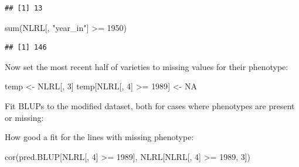 \documentclass[
]{book}
\newenvironment{Shaded}{\begin{snugshade}}{\end{snugshade}}
\newcommand{\AttributeTok}[1]{\textcolor[rgb]{0.77,0.63,0.00}{#1}}
\newcommand{\ConstantTok}[1]{\textcolor[rgb]{0.00,0.00,0.00}{#1}}
\newcommand{\DecValTok}[1]{\textcolor[rgb]{0.00,0.00,0.81}{#1}}
\newcommand{\FunctionTok}[1]{\textcolor[rgb]{0.00,0.00,0.00}{#1}}
\newcommand{\NormalTok}[1]{#1}
\newcommand{\OtherTok}[1]{\textcolor[rgb]{0.56,0.35,0.01}{#1}}
\newcommand{\SpecialCharTok}[1]{\textcolor[rgb]{0.00,0.00,0.00}{#1}}
\newcommand{\StringTok}[1]{\textcolor[rgb]{0.31,0.60,0.02}{#1}}
\begin{document}
\begin{verbatim}
## [1] 13
\end{verbatim}

\begin{Shaded}
\begin{Highlighting}[]
\FunctionTok{sum}\NormalTok{(NLRL[, }\StringTok{"year\_in"}\NormalTok{] }\SpecialCharTok{\textgreater{}=} \DecValTok{1950}\NormalTok{)}
\end{Highlighting}
\end{Shaded}

\begin{verbatim}
## [1] 146
\end{verbatim}

Now set the most recent half of varieties to missing values for their phenotype:

\begin{Shaded}
\begin{Highlighting}[]
\NormalTok{temp }\OtherTok{\textless{}{-}}\NormalTok{ NLRL[, }\DecValTok{3}\NormalTok{]}
\NormalTok{temp[NLRL[, }\DecValTok{4}\NormalTok{] }\SpecialCharTok{\textgreater{}=} \DecValTok{1989}\NormalTok{] }\OtherTok{\textless{}{-}} \ConstantTok{NA}
\end{Highlighting}
\end{Shaded}

Fit BLUPs to the modified dataset, both for cases where phenotypes are present or missing:

\begin{Shaded}
\end{Shaded}

How good a fit for the lines with missing phenotype:

\begin{Shaded}
\begin{Highlighting}[]
\FunctionTok{cor}\NormalTok{(pred.BLUP[NLRL[, }\DecValTok{4}\NormalTok{] }\SpecialCharTok{\textgreater{}=} \DecValTok{1989}\NormalTok{], NLRL[NLRL[, }\DecValTok{4}\NormalTok{] }\SpecialCharTok{\textgreater{}=} \DecValTok{1989}\NormalTok{, }\DecValTok{3}\NormalTok{])}
\end{Highlighting}
\end{Shaded}
\end{document}
